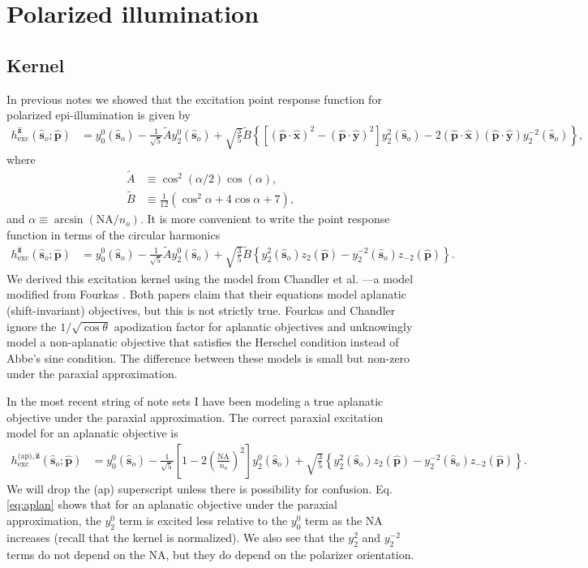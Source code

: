 \documentclass[11pt]{article}
\providecommand{\so}[1]{\mathbf{\hat{s}}_o}
\providecommand{\mh}[1]{\mathbf{\hat{#1}}}
\begin{document}
\section{Polarized illumination}
\subsection{Kernel}
In previous notes we showed that the excitation point response function for
polarized epi-illumination is given by
\begin{align}
  h^{\mh{z}}_{\text{exc}}(\so{}; \mh{p}) &= y_0^0(\so{}) - \frac{1}{\sqrt{5}}\tilde{A}y_2^0(\so{}) + \sqrt{\frac{3}{5}}\tilde{B}\left\{[(\mh{p}\cdot\mh{x})^2 - (\mh{p}\cdot\mh{y})^2]y_2^2(\so{}) - 2(\mh{p}\cdot\mh{x})(\mh{p}\cdot\mh{y})y_2^{-2}(\so{})\right\}, \label{eq:genpsf}
\end{align}
where
\begin{subequations}
\begin{align}
  \tilde{A} &\equiv \cos^2(\alpha/2)\cos(\alpha),\\
  \tilde{B} &\equiv \frac{1}{12}(\cos^2\alpha + 4\cos\alpha + 7),
\end{align}\label{eq:coefficients}%
\end{subequations}
and $\alpha \equiv \arcsin(\text{NA}/n_o)$. It is more convenient to write the point response function in terms of the circular harmonics
\begin{align}
    h^{\mh{z}}_{\text{exc}}(\so{}; \mh{p}) &= y_0^0(\so{}) - \frac{1}{\sqrt{5}}\tilde{A}y_2^0(\so{}) + \sqrt{\frac{3}{5}}\tilde{B}\left\{y_2^2(\so{})z_2(\mh{p}) - y_2^{-2}(\so{})z_{-2}(\mh{p})\right\}.
\end{align}
We derived this excitation kernel using the model from Chandler et al.
\cite{chandler17}---a model modified from Fourkas \cite{fourkas2001}. Both
papers claim that their equations model aplanatic (shift-invariant) objectives,
but this is not strictly true. Fourkas and Chandler ignore the
$1/\sqrt{\cos\theta}$ apodization factor for aplanatic objectives and
unknowingly model a non-aplanatic objective that satisfies the Herschel
condition instead of Abbe's sine condition. The difference between these
models is small but non-zero under the paraxial approximation. 

In the most recent string of note sets I have been modeling a true aplanatic
objective under the paraxial approximation. The correct paraxial excitation model
for an aplanatic objective is 
\begin{align}
  h^{\text{(ap)},\mh{z}}_{\text{exc}}(\so{}; \mh{p}) &= y_0^0(\so{}) - \frac{1}{\sqrt{5}}\left[1 - 2\left(\frac{\text{NA}}{n_o}\right)^2\right]y_2^0(\so{}) + \sqrt{\frac{3}{5}}\left\{y_2^2(\so{})z_2(\mh{p}) - y_2^{-2}(\so{})z_{-2}(\mh{p})\right\}. \label{eq:aplan}
\end{align}
We will drop the (ap) superscript unless there is possibility for confusion. Eq.
\ref{eq:aplan} shows that for an aplanatic objective under the paraxial
approximation, the $y_2^0$ term is excited less relative to the $y_0^0$ term as
the NA increases (recall that the kernel is normalized). We also see that the
$y_2^2$ and $y_2^{-2}$ terms do not depend on the NA, but they do depend on the
polarizer orientation.
\end{document}
